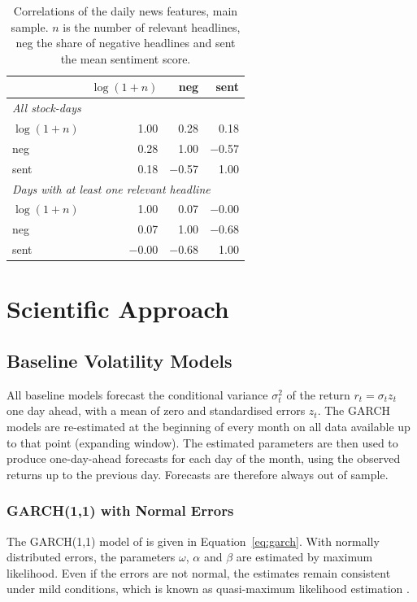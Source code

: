 \documentclass[12pt,a4paper]{article}
\begin{document}
\begin{table}[htbp]
  \centering\small
  \caption[Correlations of the news features]{Correlations of the daily news features, main sample. $n$ is the number of relevant headlines, neg the share of negative headlines and sent the mean sentiment score.}
  \label{tab:corr}
  \begin{tabular}{lrrr}
    \toprule
     & $\log(1+n)$ & neg & sent \\
    \midrule
    \multicolumn{4}{l}{\emph{All stock-days}} \\
    $\log(1+n)$ & 1.00 & 0.28 & 0.18 \\
    neg & 0.28 & 1.00 & $-$0.57 \\
    sent & 0.18 & $-$0.57 & 1.00 \\
    \midrule
    \multicolumn{4}{l}{\emph{Days with at least one relevant headline}} \\
    $\log(1+n)$ & 1.00 & 0.07 & $-$0.00 \\
    neg & 0.07 & 1.00 & $-$0.68 \\
    sent & $-$0.00 & $-$0.68 & 1.00 \\
    \bottomrule
  \end{tabular}
\end{table}

\section{Scientific Approach}\label{sec:method}

\subsection{Baseline Volatility Models}\label{sec:method-baseline}
All baseline models forecast the conditional variance $\sigma_t^2$ of the return $r_t = \sigma_t z_t$ one day ahead, with a mean of zero and standardised errors $z_t$. The GARCH models are re-estimated at the beginning of every month on all data available up to that point (expanding window). The estimated parameters are then used to produce one-day-ahead forecasts for each day of the month, using the observed returns up to the previous day. Forecasts are therefore always out of sample.

\subsubsection{GARCH(1,1) with Normal Errors}\label{sec:garch-n}
The GARCH(1,1) model of \textcite{bollerslev1986} is given in Equation~\eqref{eq:garch}. With normally distributed errors, the parameters $\omega$, $\alpha$ and $\beta$ are estimated by maximum likelihood. Even if the errors are not normal, the estimates remain consistent under mild conditions, which is known as quasi-maximum likelihood estimation \parencite{bollerslev1992}.
\end{document}
